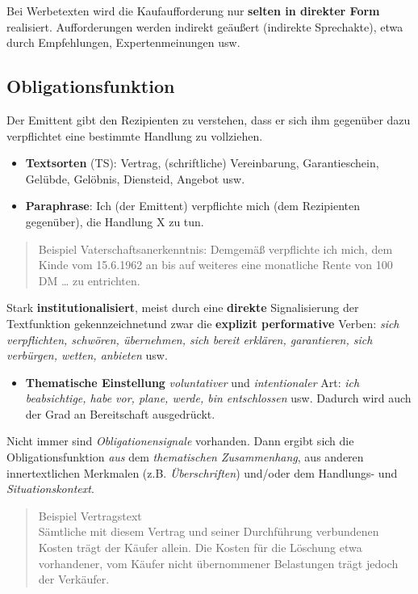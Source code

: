 \documentclass[
  letterpaper,
]{scrbook}
\providecommand{\tightlist}{%
  \setlength{\itemsep}{0pt}\setlength{\parskip}{0pt}}\usepackage{longtable,booktabs,array}
\begin{document}
Bei Werbetexten wird die Kaufaufforderung nur \textbf{selten in direkter
Form} realisiert. Aufforderungen werden indirekt geäußert (indirekte
Sprechakte), etwa durch Empfehlungen, Expertenmeinungen usw.

\hypertarget{obligationsfunktion}{%
\subsection{Obligationsfunktion}\label{obligationsfunktion}}

Der Emittent gibt den Rezipienten zu verstehen, dass er sich ihm
gegenüber dazu verpflichtet eine bestimmte Handlung zu vollziehen.

\begin{itemize}
\item
  \textbf{Textsorten} (TS): Vertrag, (schriftliche) Vereinbarung,
  Garantieschein, Gelübde, Gelöbnis, Diensteid, Angebot usw.
\item
  \textbf{Paraphrase}: Ich (der Emittent) verpflichte mich (dem
  Rezipienten gegenüber), die Handlung X zu tun.
\end{itemize}

\begin{quote}
Beispiel Vaterschaftsanerkenntnis: Demgemäß verpflichte ich mich, dem
Kinde vom 15.6.1962 an bis auf weiteres eine monatliche Rente von 100 DM
\ldots{} zu entrichten.
\end{quote}

Stark \textbf{institutionalisiert}, meist durch eine \textbf{direkte}
Signalisierung der Textfunktion gekennzeichnetund zwar die
\textbf{explizit performative} Verben: \emph{sich verpflichten,
schwören, übernehmen, sich bereit erklären, garantieren, sich verbürgen,
wetten, anbieten} usw.

\begin{itemize}
\tightlist
\item
  \textbf{Thematische Einstellung} \emph{voluntativer} und
  \emph{intentionaler} Art: \emph{ich beabsichtige, habe vor, plane,
  werde, bin entschlossen} usw. Dadurch wird auch der Grad an
  Bereitschaft ausgedrückt.
\end{itemize}

Nicht immer sind \emph{Obligationensignale} vorhanden. Dann ergibt sich
die Obligationsfunktion \emph{aus} dem \emph{thematischen Zusammenhang},
aus anderen innertextlichen Merkmalen (z.B. \emph{Überschriften})
und/oder dem Handlungs- und \emph{Situationskontext}.

\begin{quote}
Beispiel Vertragstext\\
Sämtliche mit diesem Vertrag und seiner Durchführung verbundenen Kosten
trägt der Käufer allein. Die Kosten für die Löschung etwa vorhandener,
vom Käufer nicht übernommener Belastungen trägt jedoch der Verkäufer.
\end{quote}
\end{document}
